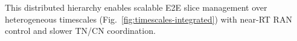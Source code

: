 \documentclass[12pt,lettersize,journal,onecolumn]{IEEEtran}
\begin{document}
This distributed hierarchy enables scalable E2E slice management over heterogeneous timescales (Fig.~\ref{fig:timescales-integrated}) with near-RT RAN control and slower TN/CN coordination.


\end{document}
